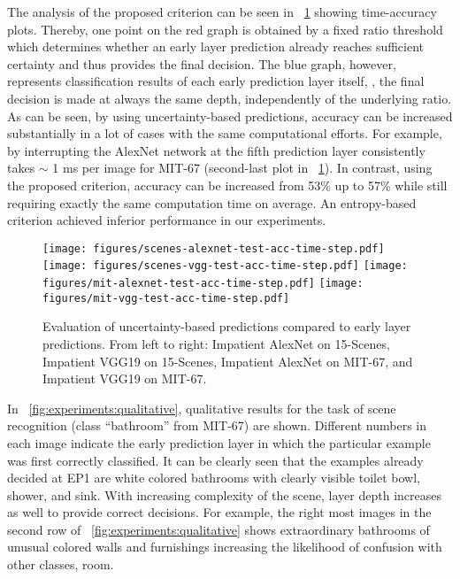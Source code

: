 \documentclass{bmvc2k}
\begin{document}
    The analysis of the proposed criterion can be seen in \figurename~\ref{fig:experiments:entropy} showing time-accuracy plots.
    Thereby, one point on the red graph is obtained by a fixed ratio threshold which determines whether an early layer prediction already reaches sufficient certainty and thus provides the final decision.
    The blue graph, however, represents classification results of each early prediction layer itself, \ie, the final decision is made at always the same depth, independently of the underlying ratio.
    As can be seen, by using uncertainty-based predictions, accuracy can be increased substantially in a lot of cases with the same computational efforts.
    For example, by interrupting the AlexNet network at the fifth prediction layer consistently takes $\sim$ 1 ms per image for MIT-67 (second-last plot in \figurename~\ref{fig:experiments:entropy}).
    In contrast, using the proposed criterion, accuracy can be increased from 53\% up to 57\% while still requiring exactly the same computation time on average.
    An entropy-based criterion achieved inferior performance in our experiments.

    \begin{figure}[tb]
        \centering
        \texttt{[image: figures/scenes-alexnet-test-acc-time-step.pdf]}
        \texttt{[image: figures/scenes-vgg-test-acc-time-step.pdf]}
        \texttt{[image: figures/mit-alexnet-test-acc-time-step.pdf]}
        \texttt{[image: figures/mit-vgg-test-acc-time-step.pdf]}
        \caption{
            Evaluation of uncertainty-based predictions compared to early layer predictions.
            From left to right: Impatient AlexNet on 15-Scenes, Impatient VGG19 on 15-Scenes, Impatient AlexNet on MIT-67, and Impatient VGG19 on MIT-67.
        }
        \label{fig:experiments:entropy}
    \end{figure}




    In \figurename~\ref{fig:experiments:qualitative}, qualitative results for the task of scene recognition (class ``bathroom'' from MIT-67) are shown.
    Different numbers in each image indicate the early prediction layer in which the particular example was first correctly classified.
    It can be clearly seen that the examples already decided at EP1 are white colored bathrooms with clearly visible toilet bowl, shower, and sink.
    With increasing complexity of the scene, layer depth increases as well to provide correct decisions.
    For example, the right most images in the second row of \figurename~\ref{fig:experiments:qualitative} shows extraordinary bathrooms of unusual colored walls and furnishings increasing the likelihood of confusion with other classes, \eg\children room.
\end{document}
